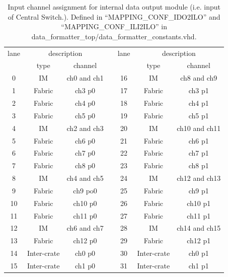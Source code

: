 \documentclass[11pt,letterpaper]{article}
\begin{document}
\begin{table}[h]
\centering
\begin{tabular}{|c|c|c|c|c|c|c|}
\cline{1-3} \cline{5-7}
lane & \multicolumn{2}{c|}{description} &  & lane & \multicolumn{2}{c|}{description} \\ \cline{1-3} \cline{5-7} 
     & type            & channel        &  &      & type           & channel         \\ \cline{1-3} \cline{5-7} 
0    & IM              & ch0 and ch1    &  & 16   & IM             & ch8 and ch9     \\ \cline{1-3} \cline{5-7} 
1    & Fabric          & ch3 p0         &  & 17   & Fabric         & ch3 p1          \\ \cline{1-3} \cline{5-7} 
2    & Fabric          & ch4 p0         &  & 18   & Fabric         & ch4 p1          \\ \cline{1-3} \cline{5-7} 
3    & Fabric          & ch5 p0         &  & 19   & Fabric         & ch5 p1          \\ \cline{1-3} \cline{5-7} 
4    & IM              & ch2 and ch3    &  & 20   & IM             & ch10 and ch11   \\ \cline{1-3} \cline{5-7} 
5    & Fabric          & ch6 p0         &  & 21   & Fabric         & ch6 p1          \\ \cline{1-3} \cline{5-7} 
6    & Fabric          & ch7 p0         &  & 22   & Fabric         & ch7 p1          \\ \cline{1-3} \cline{5-7} 
7    & Fabric          & ch8 p0         &  & 23   & Fabric         & ch8 p1          \\ \cline{1-3} \cline{5-7} 
8    & IM              & ch4 and ch5    &  & 24   & IM             & ch12 and ch13   \\ \cline{1-3} \cline{5-7} 
9    & Fabric          & ch9 po0        &  & 25   & Fabric         & ch9 p1          \\ \cline{1-3} \cline{5-7} 
10   & Fabric          & ch10 p0        &  & 26   & Fabric         & ch10 p1         \\ \cline{1-3} \cline{5-7} 
11   & Fabric          & ch11 p0        &  & 27   & Fabric         & ch11 p1         \\ \cline{1-3} \cline{5-7} 
12   & IM              & ch6 and ch7    &  & 28   & IM             & ch14 and ch15   \\ \cline{1-3} \cline{5-7} 
13   & Fabric          & ch12 p0        &  & 29   & Fabric         & ch12 p1         \\ \cline{1-3} \cline{5-7} 
14   & Inter-crate     & ch0 p0         &  & 30   & Inter-crate    & ch0 p1          \\ \cline{1-3} \cline{5-7} 
15   & Inter-crate     & ch1 p0         &  & 31   & Inter-crate    & ch1 p1          \\ \cline{1-3} \cline{5-7} 
\end{tabular}
\caption{Input channel assignment for internal data output module (i.e. input of Central Switch.). Defined in 
``MAPPING\_CONF\_IDO2ILO'' and ``MAPPING\_CONF\_ILI2ILO'' in data\_formatter\_top/data\_formatter\_constants.vhd.}
\end{table}
\end{document}

